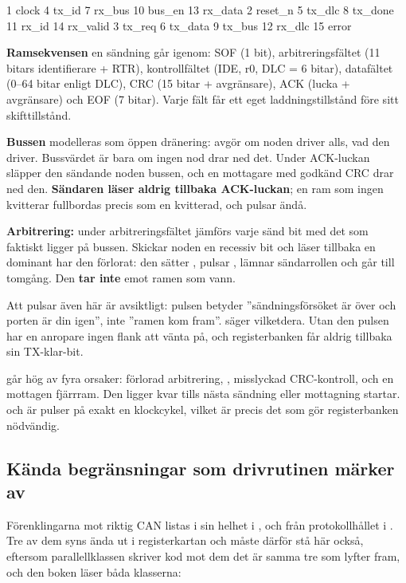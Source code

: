 \begin{textdrawing}
 1 clock     4 tx_id    7 rx_bus    10 bus_en   13 rx_data
 2 reset_n   5 tx_dlc   8 tx_done   11 rx_id    14 rx_valid
 3 tx_req    6 tx_data  9 tx_bus    12 rx_dlc   15 error
\end{textdrawing}

\textbf{Ramsekvensen} en sändning går igenom: SOF (1 bit), arbitreringsfältet (11 bitars
identifierare + RTR), kontrollfältet (IDE, r0, DLC = 6 bitar), datafältet (0--64 bitar enligt DLC),
CRC (15 bitar + avgränsare), ACK (lucka + avgränsare) och EOF (7 bitar). Varje fält får ett eget
laddningstillstånd före sitt skifttillstånd.

\textbf{Bussen} modelleras som öppen dränering:  avgör om noden driver alls,
 vad den driver. Bussvärdet är  bara om ingen nod drar ned det. Under
ACK-luckan släpper den sändande noden bussen, och en mottagare med godkänd CRC drar ned den.
\textbf{Sändaren läser aldrig tillbaka ACK-luckan}; en ram som ingen kvitterar fullbordas precis som
en kvitterad, och  pulsar ändå.

\textbf{Arbitrering:} under arbitreringsfältet jämförs varje sänd bit med det som faktiskt ligger på
bussen. Skickar noden en recessiv bit och läser tillbaka en dominant har den förlorat: den sätter
, pulsar , lämnar sändarrollen och går till tomgång. Den \textbf{tar inte}
emot ramen som vann.

Att  pulsar även här är avsiktligt: pulsen betyder ”sändningsförsöket är över och
porten är din igen”, inte ”ramen kom fram”.  säger vilketdera. Utan den pulsen har en
anropare ingen flank att vänta på, och registerbanken får aldrig tillbaka sin TX-klar-bit.

\textbf{} går hög av fyra orsaker: förlorad arbitrering, , misslyckad
CRC-kontroll, och en mottagen fjärrram. Den ligger kvar tills nästa sändning eller mottagning
startar. \textbf{} och \textbf{} är pulser på exakt en klockcykel, vilket
är precis det som gör registerbanken nödvändig.

\subsection{Kända begränsningar som drivrutinen märker av}
\label{app:project:limits}

Förenklingarna mot riktig CAN listas i sin helhet i , och från protokollhållet i
. Tre av dem syns ända ut i registerkartan och måste därför stå här också, eftersom
parallellklassen skriver kod mot dem \textemdash{} det är samma tre som \canbook{} lyfter fram, och
den boken läser båda klasserna:

